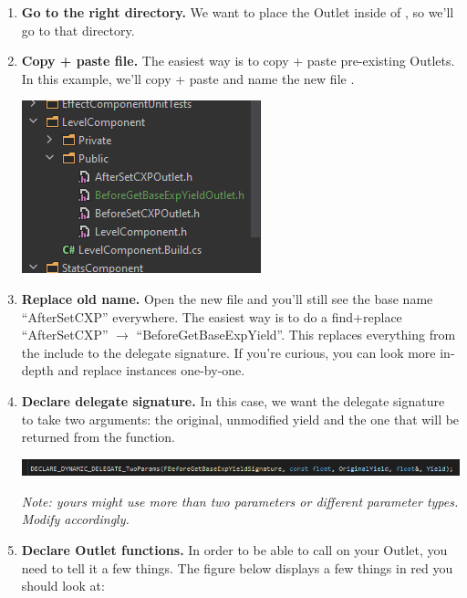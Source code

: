 \begin{enumerate}
	\item{\textbf{Go to the right directory.} We want to place the Outlet inside of , so we'll go to that directory.}
	\item{\textbf{Copy + paste file.} The easiest way is to copy + paste pre-existing Outlets. In this example, we'll copy + paste  and name the new file . \\
	\begin{center}
		\includegraphics[scale=2]{create-outlet-rename}
	\end{center}
	}
	\item{\textbf{Replace old name.} Open the new file and you'll still see the base name ``AfterSetCXP'' everywhere. The easiest way is to do a find+replace ``AfterSetCXP'' $\rightarrow$ ``BeforeGetBaseExpYield''. This replaces everything from the  include to the delegate signature. If you're curious, you can look more in-depth and replace instances one-by-one.}
	\item{\textbf{Declare delegate signature.} In this case, we want the delegate signature to take two arguments: the original, unmodified yield and the one that will be returned from the  function.\\
	\begin{center}
		\includegraphics[scale=2]{create-outlet-signature}
	\end{center}
	\textit{Note: yours might use more than two parameters or different parameter types. Modify accordingly.}
	}
	\item{\textbf{Declare Outlet functions.} In order to be able to call  on your Outlet, you need to tell it a few things. The figure below displays a few things in red you should look at:\\
	\begin{center}

\end{center}}
\end{enumerate}
